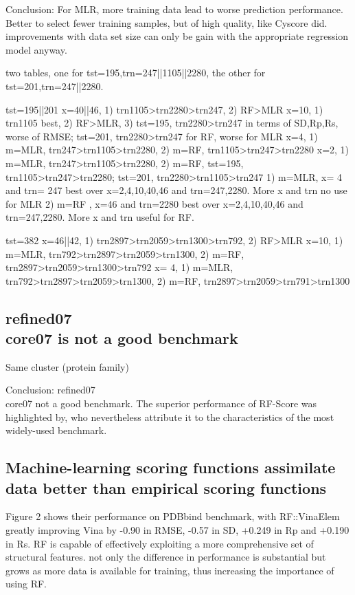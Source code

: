 \documentclass[journal=jacsat,manuscript=article]{achemso}
\begin{document}
Conclusion: For MLR, more training data lead to worse prediction performance. Better to select fewer training samples, but of high quality, like Cyscore did.
improvements with data set size can only be gain with the appropriate regression model anyway.

two tables, one for tst=195,trn=247||1105||2280, the other for tst=201,trn=247||2280.

tst=195||201
x=40||46, 1) trn1105>trn2280>trn247, 2) RF>MLR
x=10, 1) trn1105 best, 2) RF>MLR, 3) tst=195, trn2280>trn247 in terms of SD,Rp,Rs, worse of RMSE; tst=201, trn2280>trn247 for RF, worse for MLR
x=4, 1) m=MLR, trn247>trn1105>trn2280, 2) m=RF, trn1105>trn247>trn2280
x=2, 1) m=MLR, trn247>trn1105>trn2280, 2) m=RF, tst=195, trn1105>trn247>trn2280; tst=201, trn2280>trn1105>trn247
1) m=MLR, x= 4 and trn= 247 best over x={2,4,10,40,46} and trn={247,2280}. More x and trn no use for MLR
2) m=RF , x=46 and trn=2280 best over x={2,4,10,40,46} and trn={247,2280}. More x and trn useful for RF.

tst=382
x=46||42, 1) trn2897>trn2059>trn1300>trn792, 2) RF>MLR
x=10, 1) m=MLR, trn792>trn2897>trn2059>trn1300, 2) m=RF, trn2897>trn2059>trn1300>trn792
x= 4, 1) m=MLR, trn792>trn2897>trn2059>trn1300, 2) m=RF, trn2897>trn2059>trn791>trn1300

\subsection{refined07\\core07 is not a good benchmark}

Same cluster (protein family)

Conclusion: refined07\\core07 not a good benchmark.
The superior performance of RF-Score was highlighted by, who nevertheless attribute it to the characteristics of the most widely-used benchmark. \cite{774}

\subsection{Machine-learning scoring functions assimilate data better than empirical scoring functions}

Figure 2 shows their performance on PDBbind benchmark, with RF::VinaElem greatly improving Vina by -0.90 in RMSE, -0.57 in SD, +0.249 in Rp and +0.190 in Rs.
RF is capable of effectively exploiting a more comprehensive set of structural features.
not only the difference in performance is substantial but grows as more data is available for training, thus increasing the importance of using RF.
\end{document}
